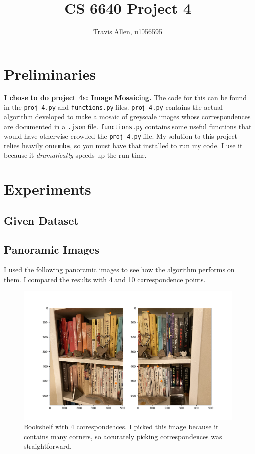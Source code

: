 \documentclass[]{article}
\title{CS 6640 Project 4}
\author{Travis Allen, u1056595}
\begin{document}
	\maketitle
	
	\newpage
	\section{Preliminaries}

	\vskip 10pt

	\textbf{I chose to do project 4a: Image Mosaicing.} The code for this can be found in the \texttt{proj\_4.py} and \texttt{functions.py} files. \texttt{proj\_4.py} contains the actual algorithm developed to make a mosaic of greyscale images whose correspondences are documented in a \texttt{.json} file. \texttt{functions.py} contains some useful functions that would have otherwise crowded the \texttt{proj\_4.py} file. My solution to this project relies heavily on\texttt{numba}, so you must have that installed to run my code. I use it because it \emph{dramatically} speeds up the run time. 

\section{Experiments}	
	\subsection{Given Dataset}
	
	\newpage
	
	\subsection{Panoramic Images}
		I used the following panoramic images to see how the algorithm performs on them. I compared the results with 4 and 10 correspondence points.
	
	\begin{figure}[H]
		\centering
		\includegraphics[width=6.5in]{test_images/shelf_4_correspondences.png}
		\caption{Bookshelf with 4 correspondences. I picked this image because it contains many corners, so accurately picking correspondences was straightforward.}
	\end{figure}
	
\end{document}

